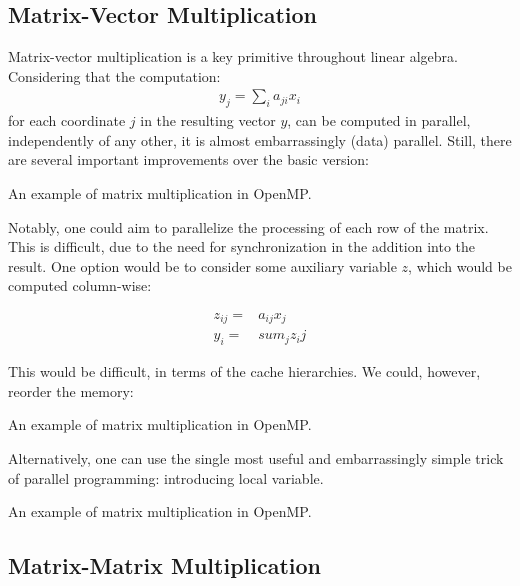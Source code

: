 \subsection{Matrix-Vector Multiplication}


Matrix-vector multiplication is a key primitive throughout 
linear algebra. Considering that the computation:
\begin{align}
    y_j=\sum_{i} a_{ji} x_i
\end{align}
for each coordinate $j$ in the resulting vector $y$,
can be computed in parallel, independently of any other,
it is almost embarrassingly (data) parallel. Still,
there are several important improvements over the basic version:  

\begin{codebox}[breakable]{}
\footnotesize An example of matrix multiplication in OpenMP.
\tcblower
{}
\end{codebox}

Notably, one could aim to parallelize the processing of each row
of the matrix. This is difficult, due to the need for synchronization
in the addition into the result. 
One option would be to consider some auxiliary variable $z$,
which would be computed column-wise:

\begin{align}
z_{ij} = & a_{ij} x_j\\
y_i    = & sum_{j} z_ij
\end{align}

This would be difficult, in terms of the cache hierarchies. 
We could, however, reorder the memory:

\begin{codebox}[breakable]{}
\footnotesize An example of matrix multiplication in OpenMP.
\tcblower
{}
\end{codebox}

Alternatively, one can use the single most useful 
and embarrassingly simple trick of parallel programming:
introducing local variable. 

\begin{codebox}[breakable]{}
\footnotesize An example of matrix multiplication in OpenMP.
\tcblower
{}
\end{codebox}

\subsection{Matrix-Matrix Multiplication}


